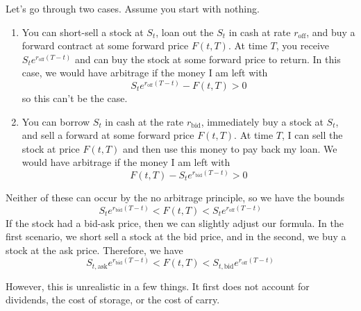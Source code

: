 \documentclass{article}
\begin{document}
    \begin{solution}
      Let's go through two cases. Assume you start with nothing. 
      \begin{enumerate}
        \item You can short-sell a stock at $S_t$, loan out the $S_t$ in cash at rate $r_{\mathrm{off}}$, and buy a forward contract at some forward price $F(t, T)$. At time $T$, you receive $S_t e^{r_{\mathrm{off}} (T - t)}$ and can buy the stock at some forward price to return. In this case, we would have arbitrage if the money I am left with
        \begin{equation}
          S_t e^{r_{\mathrm{off}} (T - t)} - F(t, T) > 0
        \end{equation}
        so this can't be the case. 

        \item You can borrow $S_t$ in cash at the rate $r_{\mathrm{bid}}$, immediately buy a stock at $S_t$, and sell a forward at some forward price $F(t, T)$. At time $T$, I can sell the stock at price $F(t, T)$ and then use this money to pay back my loan. We would have arbitrage if the money I am left with 
        \begin{equation}
          F(t, T) - S_t e^{r_{\mathrm{bid}} (T - t)} > 0
        \end{equation}
      \end{enumerate}
      Neither of these can occur by the no arbitrage principle, so we have the bounds 
      \begin{equation}
          S_t e^{r_{\mathrm{bid}} (T - t)} < F(t, T) < S_t e^{r_{\mathrm{off}} (T - t)}
      \end{equation}
      If the stock had a bid-ask price, then we can slightly adjust our formula. In the first scenario, we short sell a stock at the bid price, and in the second, we buy a stock at the ask price. Therefore, we have 
      \begin{equation}
        S_{t, \mathrm{ask}} e^{r_{\mathrm{bid}} (T - t)} < F(t, T) < S_{t, \mathrm{bid}} e^{r_{\mathrm{off}} (T - t)}
      \end{equation}
    \end{solution}

    However, this is unrealistic in a few things. It first does not account for dividends, the cost of storage, or the cost of carry. 
\end{document}
